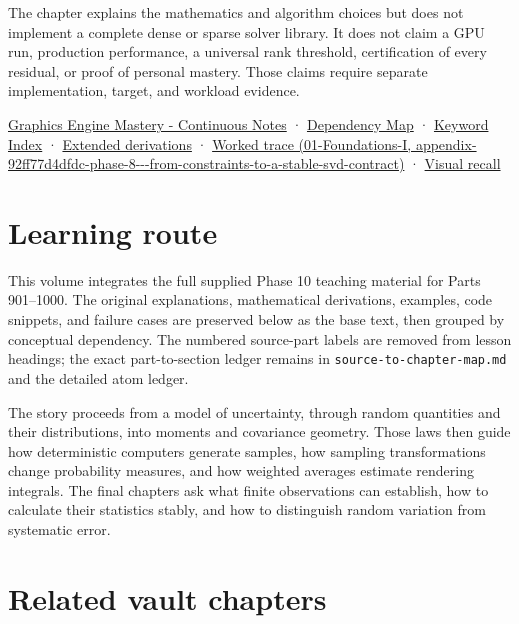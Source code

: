 The chapter explains the mathematics and algorithm choices but does not implement a complete dense or sparse solver library. It does not claim a GPU run, production performance, a universal rank threshold, certification of every residual, or proof of personal mastery. Those claims require separate implementation, target, and workload evidence.

\href{Graphics\%20Engine\%20Mastery\%20-\%20Continuous\%20Notes}{Graphics Engine Mastery - Continuous Notes} · \hyperref[appendix-4ad47bdd269a]{Dependency Map} · \hyperref[appendix-a6d556a4ef50]{Keyword Index} · \hyperref[02-foundations-ii-ch039-phase-8---linear-systems-and-decompositions]{Extended derivations} · \href{../01-Foundations-I/main.pdf\#nameddest=appendix-92ff77d4dfdc-phase-8---from-constraints-to-a-stable-svd-contract}{Worked trace (01-Foundations-I, appendix-92ff77d4dfdc-phase-8-\/-\/-from-constraints-to-a-stable-svd-contract)} · \hyperref[appendix-932cf7182ff1]{Visual recall}

\section{Learning route}\label{02-foundations-ii-ch039-learning-route}

This volume integrates the full supplied Phase 10 teaching material for Parts 901--1000. The original explanations, mathematical derivations, examples, code snippets, and failure cases are preserved below as the base text, then grouped by conceptual dependency. The numbered source-part labels are removed from lesson headings; the exact part-to-section ledger remains in \texttt{source-to-chapter-map.md} and the detailed atom ledger.

The story proceeds from a model of uncertainty, through random quantities and their distributions, into moments and covariance geometry. Those laws then guide how deterministic computers generate samples, how sampling transformations change probability measures, and how weighted averages estimate rendering integrals. The final chapters ask what finite observations can establish, how to calculate their statistics stably, and how to distinguish random variation from systematic error.

\section{Related vault chapters}\label{02-foundations-ii-ch039-related-vault-chapters}

